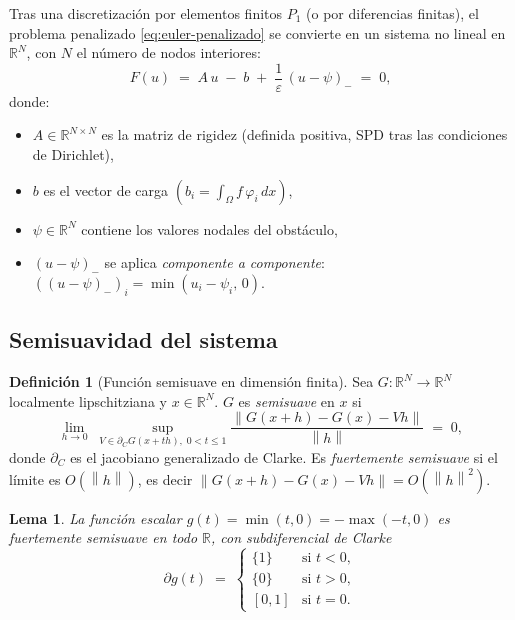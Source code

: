 \documentclass[11pt,a4paper]{article}
\newtheorem{lema}[teorema]{Lema}
\theoremstyle{definition}
\newtheorem{definicion}[teorema]{Definición}
\theoremstyle{remark}
\newcommand{\R}{\mathbb{R}}
\newcommand{\Norm}[1]{\left\lVert #1 \right\rVert}
\begin{document}
Tras una discretización por elementos finitos $P_1$ (o por diferencias
finitas), el problema penalizado \eqref{eq:euler-penalizado} se convierte
en un sistema no lineal en $\R^N$, con $N$ el número de nodos interiores:
\begin{equation}\label{eq:sistema}
F(u) \;=\; A\,u \;-\; b \;+\; \frac{1}{\varepsilon}\,(u - \psi)_- \;=\; 0,
\end{equation}
donde:
\begin{itemize}
\item $A \in \R^{N\times N}$ es la matriz de rigidez (definida positiva,
SPD tras las condiciones de Dirichlet),
\item $b$ es el vector de carga $(b_i = \int_\Omega f\,\varphi_i\,dx)$,
\item $\psi \in \R^N$ contiene los valores nodales del obstáculo,
\item $(u - \psi)_-$ se aplica \emph{componente a componente}:
$((u-\psi)_-)_i = \min(u_i - \psi_i,\, 0)$.
\end{itemize}

\subsection{Semisuavidad del sistema}

\begin{definicion}[Función semisuave en dimensión finita]
Sea $G : \R^N \to \R^N$ localmente lipschitziana y $x \in \R^N$. $G$ es
\emph{semisuave} en $x$ si
\[
\lim_{h \to 0}\;
\sup_{V \in \partial_C G(x + t h),\; 0 < t \le 1}
\frac{\Norm{G(x+h) - G(x) - V h}}{\Norm{h}} \;=\; 0,
\]
donde $\partial_C$ es el jacobiano generalizado de Clarke. Es
\emph{fuertemente semisuave} si el límite es $O(\Norm{h})$, es decir
$\Norm{G(x+h) - G(x) - Vh} = O(\Norm{h}^2)$.
\end{definicion}

\begin{lema}\label{lema:g-semisuave}
La función escalar $g(t) = \min(t, 0) = -\max(-t, 0)$ es fuertemente
semisuave en todo $\R$, con subdiferencial de Clarke
\[
\partial g(t) \;=\;
\begin{cases}
\{1\} & \text{si } t < 0,\\
\{0\} & \text{si } t > 0,\\
[0, 1] & \text{si } t = 0.
\end{cases}
\]
\end{lema}
\end{document}
